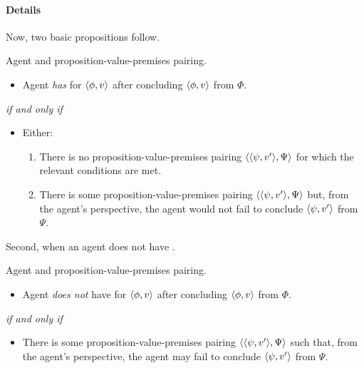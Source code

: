 \paragraph{Details}

\begin{note}
  Now, two basic propositions follow.

  \begin{proposition}
    Agent and proposition-value-premises pairing.

    \begin{itemize}
    \item
      Agent \emph{has} \zS{} for \(\langle \phi, v \rangle\) after concluding \(\langle \phi, v \rangle\) from \(\Phi\).
    \end{itemize}

    \emph{if and only if}

    \begin{itemize}
    \item
      Either:
      \begin{enumerate}[label=(\alph*), ref=\alph*]
      \item
        There is no proposition-value-premises pairing \(\langle \langle \psi, v' \rangle, \Psi \rangle\) for which the relevant conditions are met.
      \item
        There is some proposition-value-premises pairing \(\langle \langle \psi, v' \rangle, \Psi \rangle\) but, from the agent's perspective, the agent would not fail to conclude \(\langle \psi, v' \rangle\) from \(\Psi\).
      \end{enumerate}
    \end{itemize}
  \end{proposition}

  Second, when an agent does not have \zS{}.

  \begin{proposition}
    Agent and proposition-value-premises pairing.
    \begin{itemize}
    \item
      Agent \emph{does not} have \zS{} for \(\langle \phi, v \rangle\) after concluding \(\langle \phi, v \rangle\) from \(\Phi\).
    \end{itemize}

    \emph{if and only if}

    \begin{itemize}
    \item
      There is some proposition-value-premises pairing \(\langle \langle \psi, v' \rangle, \Psi \rangle\) such that, from the agent's perspective, the agent may fail to conclude \(\langle \psi, v' \rangle\) from \(\Psi\).
    \end{itemize}
  \end{proposition}
\end{note}

